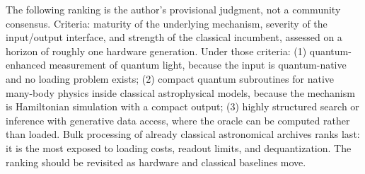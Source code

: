 \begin{thesisbox}
The following ranking is the author's provisional judgment, not a community consensus. Criteria: maturity of the underlying mechanism, severity of the input/output interface, and strength of the classical incumbent, assessed on a horizon of roughly one hardware generation. Under those criteria: (1) quantum-enhanced measurement of quantum light, because the input is quantum-native and no loading problem exists; (2) compact quantum subroutines for native many-body physics inside classical astrophysical models, because the mechanism is Hamiltonian simulation with a compact output; (3) highly structured search or inference with generative data access, where the oracle can be computed rather than loaded. Bulk processing of already classical astronomical archives ranks last: it is the most exposed to loading costs, readout limits, and dequantization. The ranking should be revisited as hardware and classical baselines move.
\end{thesisbox}

